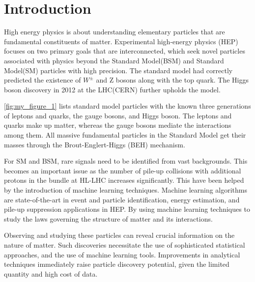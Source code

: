 \chapter{\label{intro}Introduction}

High energy physics is about understanding elementary particles that are fundamental constituents of matter.  Experimental high-energy physics (HEP) focuses on two primary goals that are interconnected, which seek novel particles associated with physics beyond the Standard Model(BSM) and Standard Model(SM) particles with high precision\cite{Salam:1964ry}\cite{GLASHOW1961579}. The standard model had correctly predicted the existence of $W^\pm$ and Z bosons along with the top quark\cite{PhysRevLett.19.1264}\cite{10.1143/PTP.49.634}. The Higgs boson discovery in 2012 at the LHC(CERN) further upholds the model\cite{Aad_2015}.

\autoref{fig:my_figure_1} lists standard model particles with the known three generations of leptons and quarks, the gauge bosons, and Higgs boson. The leptons and quarks make up matter, whereas the gauge bosons mediate the interactions among them\cite{PhysRevLett.13.321}. All massive fundamental particles in the Standard Model get their masses through the Brout-Englert-Higgs (BEH) mechanism\cite{Higgs:1964pj}.

For SM and BSM, rare signals need to be identified from vast backgrounds. This becomes an important issue as the number of pile-up collisions with additional protons in the bundle at  HL-LHC increases significantly\cite{https://doi.org/10.48550/arxiv.1807.02876}. This have been helped by the introduction of machine learning techniques. Machine learning algorithms are state-of-the-art in event and particle identification, energy estimation, and pile-up suppression applications in HEP. By using machine learning techniques to study the laws governing the structure of matter and  its interactions\cite{Baldi2014}.

Observing and studying these particles can reveal crucial information on the nature of matter\cite{Higgs_snowmass}. Such discoveries necessitate the use of sophisticated statistical approaches, and the use of machine learning tools. Improvements in analytical techniques immediately raise particle discovery potential, given the limited quantity and high cost of data.



    
